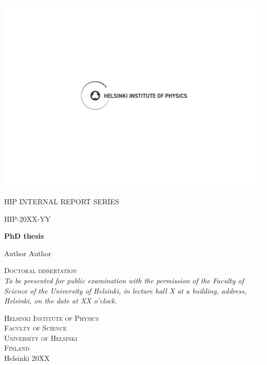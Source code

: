 \documentclass[a4paper, 12pt]{article}
\begin{document}
\begin{titlepage}
\begin{center}
\includegraphics[scale=1]{HIP-cover-logo.pdf}
\end{center}
\vspace{0.2 cm}
\begin{center}
\large
\textsc{HIP INTERNAL REPORT SERIES}

\vspace{0.2 cm}
\large

HIP-20XX-YY

\vspace{3.0 cm}
\huge
{\bf PhD thesis}

\vspace{1.5 cm}
\LARGE
Author Author

\normalsize

\vfill

\textsc{Doctoral dissertation} \\
\vspace{0.5 cm}
\textit{To be presented for public examination with the permission of the Faculty of Science of the University of Helsinki, in lecture hall X at a building, address, Helsinki, on the date at XX o'clock.}
\vfill


\textsc{Helsinki Institute of Physics}\\
\textsc{Faculty of Science}\\
\textsc{University of Helsinki}\\
\textsc{Finland} \\
\vspace{1 cm}
Helsinki 20XX


\end{center}
\end{titlepage}
\end{document}
